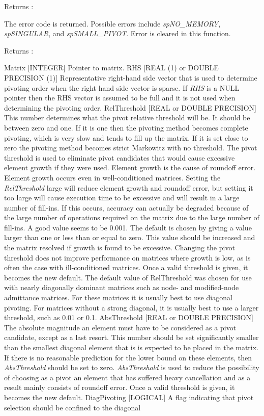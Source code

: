 \begin{Desc}
\item[Returns :]\par
[INTEGER of INTEGER$\ast$2] The error code is returned. Possible errors include {\em sp\-NO\_\-MEMORY}, {\em sp\-SINGULAR}, and {\em sp\-SMALL\_\-PIVOT}. Error is cleared in this function.\end{Desc}
\begin{Desc}
\item[Returns :]\par
Matrix [INTEGER] Pointer to matrix. RHS [REAL (1) or DOUBLE PRECISION (1)] Representative right-hand side vector that is used to determine pivoting order when the right hand side vector is sparse. If {\em RHS} is a NULL pointer then the RHS vector is assumed to be full and it is not used when determining the pivoting order. Rel\-Threshold [REAL or DOUBLE PRECISION] This number determines what the pivot relative threshold will be. It should be between zero and one. If it is one then the pivoting method becomes complete pivoting, which is very slow and tends to fill up the matrix. If it is set close to zero the pivoting method becomes strict Markowitz with no threshold. The pivot threshold is used to eliminate pivot candidates that would cause excessive element growth if they were used. Element growth is the cause of roundoff error. Element growth occurs even in well-conditioned matrices. Setting the {\em Rel\-Threshold} large will reduce element growth and roundoff error, but setting it too large will cause execution time to be excessive and will result in a large number of fill-ins. If this occurs, accuracy can actually be degraded because of the large number of operations required on the matrix due to the large number of fill-ins. A good value seems to be 0.001. The default is chosen by giving a value larger than one or less than or equal to zero. This value should be increased and the matrix resolved if growth is found to be excessive. Changing the pivot threshold does not improve performance on matrices where growth is low, as is often the case with ill-conditioned matrices. Once a valid threshold is given, it becomes the new default. The default value of Rel\-Threshold was chosen for use with nearly diagonally dominant matrices such as node- and modified-node admittance matrices. For these matrices it is usually best to use diagonal pivoting. For matrices without a strong diagonal, it is usually best to use a larger threshold, such as 0.01 or 0.1. Abs\-Threshold [REAL or DOUBLE PRECISION] The absolute magnitude an element must have to be considered as a pivot candidate, except as a last resort. This number should be set significantly smaller than the smallest diagonal element that is is expected to be placed in the matrix. If there is no reasonable prediction for the lower bound on these elements, then {\em Abs\-Threshold} should be set to zero. {\em Abs\-Threshold} is used to reduce the possibility of choosing as a pivot an element that has suffered heavy cancellation and as a result mainly consists of roundoff error. Once a valid threshold is given, it becomes the new default. Diag\-Pivoting [LOGICAL] A flag indicating that pivot selection should be confined to the diagonal 
\end{Desc}
